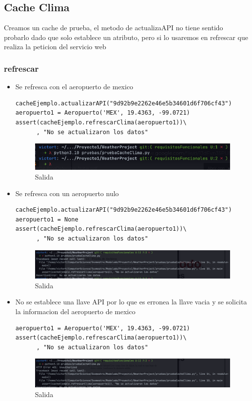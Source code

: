 \documentclass[12pt]{article}
\begin{document}
\subsection{Cache Clima}
Creamos un cache de prueba, el metodo de actualizaAPI no tiene sentido probarlo dado que solo establece un atributo, pero si lo usaremos en refrescar que realiza la peticion del servicio web
\subsubsection{refrescar}
\begin{itemize}
\item Se refresca con el aeropuerto de mexico
\begin{verbatim}
cacheEjemplo.actualizarAPI("9d92b9e2262e46e5b34601d6f706cf43")
aeropuerto1 = Aeropuerto('MEX', 19.4363, -99.0721)
assert(cacheEjemplo.refrescarClima(aeropuerto1))\
      , "No se actualizaron los datos"
\end{verbatim}
  
    \begin{figure}[h!]
    \centering
    \includegraphics[scale=0.6]{pruebasPy/cache/bien.png}
    \caption{Salida}
  \end{figure}
\item Se refresca con un aeropuerto nulo
\begin{verbatim}
cacheEjemplo.actualizarAPI("9d92b9e2262e46e5b34601d6f706cf43")
aeropuerto1 = None
assert(cacheEjemplo.refrescarClima(aeropuerto1))\
      , "No se actualizaron los datos"
\end{verbatim}
\begin{figure}[h!]
    \centering
    \includegraphics[scale=0.4]{pruebasPy/cache/refrescaMal.png}
    \caption{Salida}
  \end{figure}
\item No se establece una llave API por lo que es erronea la llave vacia y se solicita la informacion del aeropuerto de mexico
\begin{verbatim}
aeropuerto1 = Aeropuerto('MEX', 19.4363, -99.0721)
assert(cacheEjemplo.refrescarClima(aeropuerto1))\
      , "No se actualizaron los datos"
\end{verbatim}

\begin{figure}[h!]
    \centering
    \includegraphics[scale=0.4]{pruebasPy/cache/refrescaApiMal.png}
    \caption{Salida}
  \end{figure}
\end{itemize}
\newpage
\end{document}
